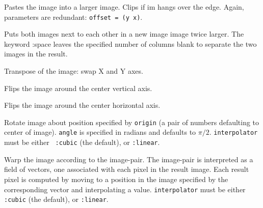 \begin{description}
\item{}
Pastes the image into a larger image.  Clips if im hangs over the
edge.  Again, parameters are redundant: {\tt offset  = (y x)}.

\item{}
Puts both images next to each other in a new image image twice larger.
The keyword :space leaves the specified number of columns blank to
separate the two images in the result.

\item{}
Transpose of the image: swap X and Y axes.

\item{}
Flips the image around the center vertical axis.

\item{}
Flips the image around the center horizontal axis.

\item{}
Rotate image about position specified by {\tt origin} (a pair of
numbers defaulting to center of image).  {\tt angle} is specified in
radians and defaults to $\pi/2$.  {\tt interpolator} must be either {\tt
:cubic} (the default), or {\tt :linear}.

\item{}
Warp the image according to the image-pair.  The image-pair is
interpreted as a field of vectors, one associated with each pixel in
the result image.  Each result pixel is computed by moving to a
position in the image specified by the corresponding vector and
interpolating a value.   {\tt interpolator} must be either {\tt
:cubic} (the default), or {\tt :linear}.

\end{description}



